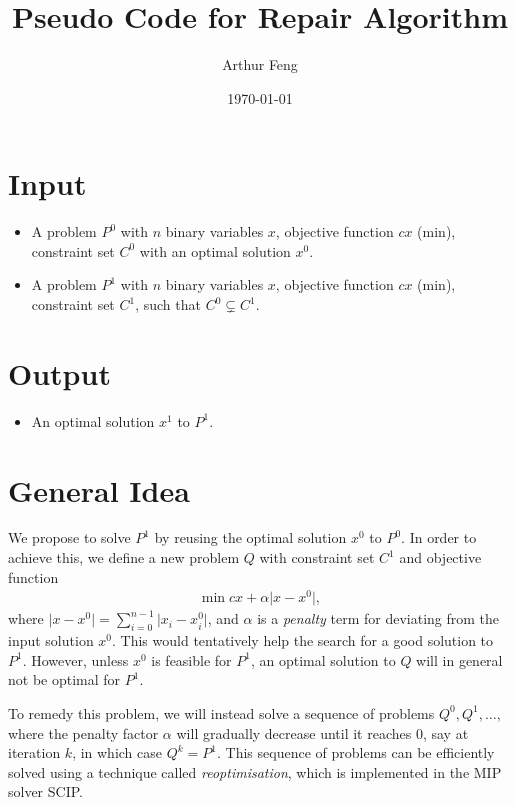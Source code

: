 \documentclass[11pt]{article}
\title{Pseudo Code for Repair Algorithm}
\author{Arthur Feng}
\date{\today}
\theoremstyle{definition}
\begin{document}
\maketitle

\section{Input}
\begin{itemize}
    \item A problem $P^0$ with $n$ binary variables $x$, objective function $c x$ (min), constraint set $C^0$ with an optimal solution $x^0$.
    \item A problem $P^1$ with $n$ binary variables $x$, objective function $c x$ (min), constraint set $C^1$, such that $C^0 \subsetneq C^1$.
\end{itemize}							

\section{Output}
\begin{itemize}	
    \item An optimal solution $x^1$ to $P^1$.
\end{itemize}

\section{General Idea}
We propose to solve $P^1$ by reusing the optimal solution $x^0$ to $P^0$.
In order to achieve this, we define a new problem $Q$ with constraint set $C^1$ and objective function
\begin{align*}
    \min c x + \alpha \lvert x - x^0 \rvert,					
\end{align*}
where $\lvert x - x^0 \rvert = \sum_{i=0}^{n-1}\lvert x_i - x^0_i \rvert$, and $\alpha$ is a \emph{penalty} term for deviating from the input solution $x^0$.
This would tentatively help the search for a good solution to $P^1$.
However, unless $x^0$ is feasible for $P^1$, an optimal solution to $Q$ will in general not be optimal for $P^1$.

To remedy this problem, we will instead solve a sequence of problems $Q^0, Q^1, \dots$, where the penalty factor $\alpha$ will gradually decrease until it reaches 0, say at iteration $k$, in which case $Q^k = P^1$.
This sequence of problems can be efficiently solved using a technique called \emph{reoptimisation}, which is implemented in the MIP solver SCIP.
\end{document}
